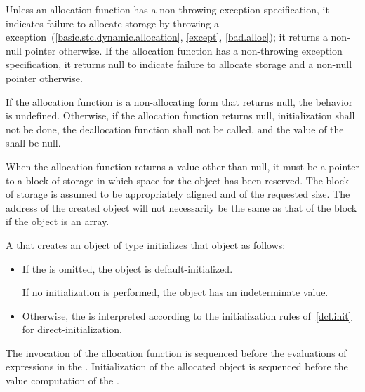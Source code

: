 \pnum
\begin{note}
Unless an allocation function has a non-throwing
exception specification,
it indicates failure to allocate storage by throwing a
%
%
 exception~(\ref{basic.stc.dynamic.allocation},
\ref{except}, \ref{bad.alloc});
it returns a non-null pointer otherwise. If the allocation function
has a non-throwing exception specification,
it returns null to indicate failure to allocate storage
and a non-null pointer otherwise.
\end{note}
If the allocation function is a non-allocating
form that returns null,
the behavior is undefined.
Otherwise,
if the allocation function returns null, initialization shall not be
done, the deallocation function shall not be called, and the value of
the  shall be null.

\pnum
\begin{note}
When the allocation function returns a value other than null, it must be
a pointer to a block of storage in which space for the object has been
reserved. The block of storage is assumed to be appropriately aligned
and of the requested size. The address of the created object will not
necessarily be the same as that of the block if the object is an array.
\end{note}

\pnum
{}%
%
%
%
A  that creates an object of type 
initializes that object as follows:

\begin{itemize}
\item If the  is omitted, the object is
default-initialized.
\begin{note}
If no initialization
is performed, the object has an indeterminate value.
\end{note}

\item Otherwise, the  is interpreted according to
the initialization rules of~\ref{dcl.init} for direct-initialization.
\end{itemize}

\pnum
{}%
%
The invocation of the allocation function is sequenced before
the evaluations of expressions in the . Initialization of
the allocated object is sequenced before the
%
value computation of the
.

